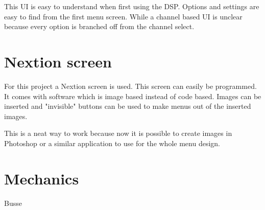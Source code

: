 This UI is easy to understand when first using the DSP. Options and settings are easy to find from the first menu screen. While a channel based UI is unclear because every option is branched off from the channel select.

\section{Nextion screen}

For this project a Nextion screen is used. This screen can easily be programmed. It comes with software which is image based instead of code based. Images can be inserted and "invisible" buttons can be used to make menus out of the inserted images.

This is a neat way to work because now it is possible to create images in Photoshop or a similar application to use for the whole menu design.

\section{Mechanics}
Busse